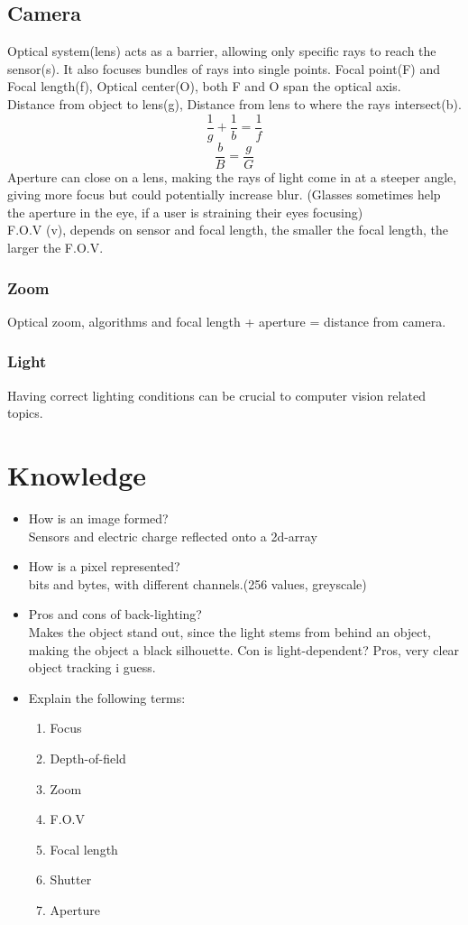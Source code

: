 \documentclass{article}
\begin{document}
\subsection{Camera}
Optical system(lens) acts as a barrier, allowing only specific rays to reach the sensor(s). It also focuses bundles of rays into single points. Focal point(F) and Focal length(f), Optical center(O), both F and O span the optical axis.\\
Distance from object to lens(g), Distance from lens to where the rays intersect(b).\\
$$\frac{1}{g}+\frac{1}{b} = \frac{1}{f}$$
$$\frac{b}{B} = \frac{g}{G}$$
Aperture can close on a lens, making the rays of light come in at a steeper angle, giving more focus but could potentially increase blur. (Glasses sometimes help the aperture in the eye, if a user is straining their eyes focusing)\\
F.O.V (v), depends on sensor and focal length, the smaller the focal length, the larger the F.O.V.
\subsubsection{Zoom}
Optical zoom, algorithms and focal length + aperture = distance from camera.

\subsubsection{Light}
Having correct lighting conditions can be crucial to computer vision related topics.


\section{Knowledge}
\begin{itemize}
  \item How is an image formed?\\
    Sensors and electric charge reflected onto a 2d-array

  \item How is a pixel represented?\\
    bits and bytes, with different channels.(256 values, greyscale)

  \item Pros and cons of back-lighting?\\
    Makes the object stand out, since the light stems from behind an object, making the object a black silhouette. Con is light-dependent? Pros, very clear object tracking i guess.

  \item Explain the following terms:
    \begin{enumerate}
      \item Focus
      \item Depth-of-field
      \item Zoom
      \item F.O.V
      \item Focal length
      \item Shutter
      \item Aperture
    \end{enumerate}
\end{itemize}
\end{document}
